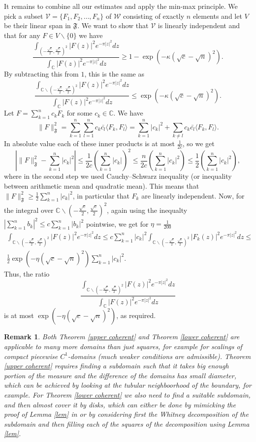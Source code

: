 \documentclass[12pt]{amsart}
\numberwithin{equation}{section}
\newcommand{\Cm}{\mathbb{C}}
\newcommand{\Fo}{\mathfrak{F}}
\newtheorem{remark}[Thm]{Remark}
\begin{document}
It remains to combine all our estimates and apply the min-max principle. We pick a subset $\mathcal{V} = \{ F_1, F_2,\ldots , F_n\}$ of $\mathcal{W}$ consisting of exactly $n$ elements and let $V$ be their linear span in $\Fo$. We want to show that $\mathcal{V}$ is linearly independent and that for any $F\in V\backslash\{0\}$ we have
$$\frac{\int_{\left(-\frac{\sqrt{c}}{2},\frac{\sqrt{c}}{2}\right)^2} |F(z)|^2e^{-\pi |z|^2}dz}{\int_\Cm |F(z)|^2e^{-\pi |z|^2}dz} \ge 1-\exp(-\kappa(\sqrt{c}-\sqrt{n})^2).$$
By subtracting this from $1$, this is the same as
$$\frac{\int_{\Cm\backslash\left(-\frac{\sqrt{c}}{2},\frac{\sqrt{c}}{2}\right)^2} |F(z)|^2e^{-\pi |z|^2}dz}{\int_\Cm |F(z)|^2e^{-\pi |z|^2}dz} \le \exp(-\kappa(\sqrt{c}-\sqrt{n})^2).$$
Let $F = \sum_{k=1}^n c_k F_k$ for some $c_k\in \Cm$. We have
$$\|F\|^2_{\Fo} = \sum_{k=1}^n\sum_{l=1}^n c_k\bar{c_l} \langle F_k, F_l\rangle = \sum_{k=1}^n |c_k|^2 + \sum_{k\neq l} c_k\bar{c_l}\langle F_k, F_l\rangle.$$
In absolute value each of these inner products is at most $\frac{1}{2c}$, so we get
$$\left|\|F\|^2_{\Fo}-\sum_{k=1}^n |c_k|^2\right|\le \frac{1}{2c}\left(\sum_{k=1}^n |c_k|\right)^2 \le \frac{n}{2c} \left(\sum_{k=1}^n |c_k|^2\right) \le \frac{1}{2}\left(\sum_{k=1}^n |c_k|^2\right),$$
where in the second step we used Cauchy--Schwarz inequality (or inequality between arithmetic mean and quadratic mean).  This means that $\|F\|_{\Fo}^2\ge \frac{1}{2}\sum_{k=1}^n |c_k|^2$, in particular that $F_k$ are linearly independent. Now, for the integral over $\Cm\backslash \left(-\frac{\sqrt{c}}{2},\frac{\sqrt{c}}{2}\right)^2$, again using the inequalty $|\sum_{k=1}^n b_k|^2 \le c\sum_{k=1}^n |b_k|^2$ pointwise, we get for $\eta = \frac{1}{200}$
\begin{align*}\int_{\Cm\backslash\left(-\frac{\sqrt{c}}{2},\frac{\sqrt{c}}{2}\right)^2} |F(z)|^2e^{-\pi |z|^2}dz \le c\sum_{k=1}^n |c_k|^2\int_{\Cm\backslash\left(-\frac{\sqrt{c}}{2},\frac{\sqrt{c}}{2}\right)^2} |F_k(z)|^2e^{-\pi |z|^2}dz\le\\ \frac{1}{2}\exp(-\eta(\sqrt{c}-\sqrt{n})^2)\sum_{k=1}^n |c_k|^2.
\end{align*}
Thus, the ratio
$$\frac{\int_{\Cm\backslash\left(-\frac{\sqrt{c}}{2},\frac{\sqrt{c}}{2}\right)^2} |F(z)|^2e^{-\pi |z|^2}dz}{\int_\Cm |F(z)|^2e^{-\pi |z|^2}dz}$$
is at most $\exp(-\eta(\sqrt{c}-\sqrt{n})^2)$, as required.
\begin{remark}Both Theorem \ref{upper coherent} and Theorem \ref{lower coherent} are applicable to many more domains than just squares, for example for scalings of compact piecewise $C^1$-domains (much weaker conditions are admissible). Theorem \ref{upper coherent} requires finding a subdomain such that it takes big enough portion of the measure and the difference of the domains has small diameter, which can be achieved by looking at the tubular neighboorhood of the boundary, for example. For Theorem \ref{lower coherent} we also need to find a suitable subdomain, and then almost cover it by disks, which can either be done by mimicking the proof of Lemma \ref{lem} in \cite{Lieb} or by considering first the Whitney decomposition of the subdomain and then filling each of the squares of the decomposition using Lemma \ref{lem}.
\end{remark}
\end{document}
